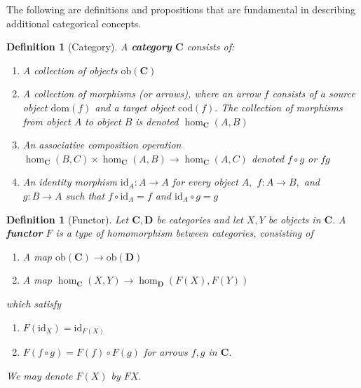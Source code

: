 \documentclass{article}
\newtheorem{definition}[proposition]{Definition}
\numberwithin{equation}{section}
\newcommand{\cat}[1]{{\mathbf{#1}}}
\newcommand{\ob}{\mathrm{ob}}
\newcommand{\dom}{\mathrm{dom}}
\newcommand{\cod}{\mathrm{cod}}
\newcommand{\id}{\mathrm{id}}
\begin{document}
The following are definitions and propositions that are fundamental in describing additional categorical concepts.

\begin{definition}[Category]
A \textbf{category} $\cat{C}$ consists of:
\begin{enumerate}
    \item{A collection of objects $\ob(\cat{C})$}
    \item{A collection of morphisms (or arrows), where an arrow $f$ consists of a source object $\dom(f)$ and a target object $\cod(f).$ The collection of morphisms from object $A$ to object $B$ is denoted $\hom_\cat{C}(A, B)$}
    \item{An associative composition operation $\hom_\cat{C}(B, C) \times \hom_\cat{C}(A, B) \to \hom_\cat{C}(A, C)$ denoted $f \circ g$ or $fg$}
    \item{An identity morphism $\id_A : A \to A$ for every object $A,$ $f : A \to B,$ and $g : B \to A$ such that $f \circ \id_A = f$ and $\id_A \circ g = g$}
\end{enumerate}
\end{definition}

\begin{definition}[Functor]
Let $\cat{C}, \cat{D}$ be categories and let $X, Y$ be objects in $\cat{C}.$ A \textbf{functor} $F$ is a type of homomorphism between categories, consisting of 

\begin{enumerate}
    \item{A map $\ob(\cat{C}) \to \ob(\cat{D})$}
    \item{A map $\hom_\cat{C}(X, Y) \to \hom_\cat{D}(F(X), F(Y))$}
\end{enumerate}

which satisfy 

\begin{enumerate}
    \item{$F(\id_X) = \id_{F(X)}$}
    \item{$F(f \circ g) = F(f) \circ F(g)$ for arrows $f, g$ in $\cat{C}.$}
\end{enumerate}

We may denote $F(X)$ by $FX.$
\end{definition}
\end{document}

